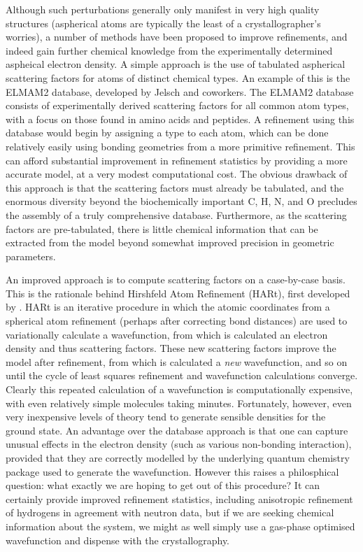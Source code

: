 \begin{refsection}
Although such perturbations generally only manifest in very high quality structures (aspherical atoms are typically the least of a crystallographer's worries), a number of methods have been proposed to improve refinements, and indeed gain further chemical knowledge from the experimentally determined aspheical electron density.
A simple approach is the use of tabulated aspherical scattering factors for atoms of distinct chemical types.
An example of this is the ELMAM2 database, developed by Jelsch and coworkers.\autocite{Domagaa2012}
The ELMAM2 database consists of experimentally derived scattering factors for all common atom types, with a focus on those found in amino acids and peptides.
A refinement using this database would begin by assigning a type to each atom, which can be done relatively easily using bonding geometries from a more primitive refinement.
This can afford substantial improvement in refinement statistics by providing a more accurate model, at a very modest computational cost.
The obvious drawback of this approach is that the scattering factors must already be tabulated, and the enormous diversity beyond the biochemically important C, H, N, and O precludes the assembly of a truly comprehensive database.
Furthermore, as the scattering factors are pre-tabulated, there is little chemical information that can be extracted from the model beyond somewhat improved precision in geometric parameters.

An improved approach is to compute scattering factors on a case-by-case basis.
This is the rationale behind Hirshfeld Atom Refinement (HARt), first developed by \citeauthor{Jayatilaka2008}.\autocite{Jayatilaka2008}
HARt is an iterative procedure in which the atomic coordinates from a spherical atom refinement (perhaps after correcting  bond distances) are used to variationally calculate a wavefunction, from which is calculated an electron density and thus scattering factors.
These new scattering factors improve the model after refinement, from which is calculated a \emph{new} wavefunction, and so on until the cycle of least squares refinement and wavefunction calculations converge.
Clearly this repeated calculation of a wavefunction is computationally expensive, with even relatively simple molecules taking minutes.
Fortunately, however, even very inexpensive levels of theory tend to generate sensible densities for the ground state.
An advantage over the database approach is that one can capture unusual effects in the electron density (such as various non-bonding interaction), provided that they are correctly modelled by the underlying quantum chemistry package used to generate the wavefunction.
However this raises a philosphical question: what exactly we are hoping to get out of this procedure?
It can certainly provide improved refinement statistics, including anisotropic refinement of hydrogens in agreement with neutron data, but if we are seeking chemical information about the system, we might as well simply use a gas-phase optimised wavefunction and dispense with the crystallography.


\end{refsection}
